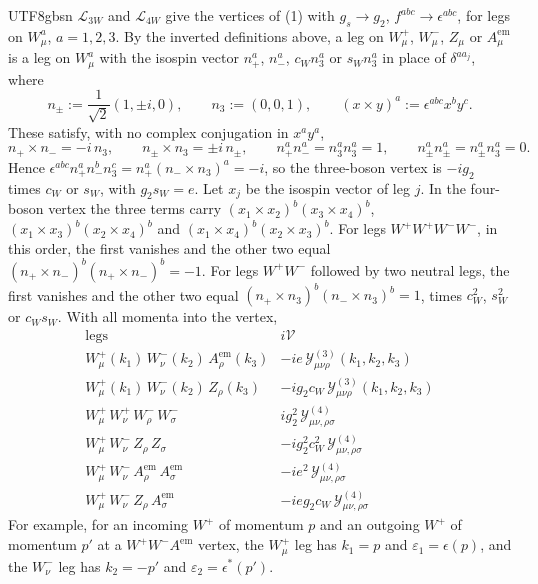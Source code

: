 \documentclass[11pt,a4paper,oneside]{report}
\begin{document}
\begin{CJK*}{UTF8}{gbsn}
$\mathcal L_{3W}$ and $\mathcal L_{4W}$ give the vertices of (1) with $g_s\to g_2$, $f^{abc}\to\epsilon^{abc}$, for legs on $W^a_\mu$, $a=1,2,3$. By the inverted definitions above, a leg on $W^+_\mu$, $W^-_\mu$, $Z_\mu$ or $A^{\mathrm{em}}_\mu$ is a leg on $W^a_\mu$ with the isospin vector $n_+^a$, $n_-^a$, $c_Wn_3^a$ or $s_Wn_3^a$ in place of $\delta^{aa_j}$, where
\begin{equation*}
n_\pm:=\frac1{\sqrt2}(1,\pm i,0),\qquad n_3:=(0,0,1),\qquad (x\times y)^a:=\epsilon^{abc}x^by^c .
\tag{A.19}\label{eq:A.19}
\end{equation*}
These satisfy, with no complex conjugation in $x^ay^a$,
\begin{equation*}
n_+\times n_-=-i\,n_3,\qquad n_\pm\times n_3=\pm i\,n_\pm,\qquad
n_+^an_-^a=n_3^an_3^a=1,\qquad n_\pm^an_\pm^a=n_\pm^an_3^a=0 .
\tag{A.20}\label{eq:A.20}
\end{equation*}
Hence $\epsilon^{abc}n_+^an_-^bn_3^c=n_+^a(n_-\times n_3)^a=-i$, so the three-boson vertex is $-ig_2$ times $c_W$ or $s_W$, with $g_2s_W=e$. Let $x_j$ be the isospin vector of leg $j$. In the four-boson vertex the three terms carry $(x_1\times x_2)^b(x_3\times x_4)^b$, $(x_1\times x_3)^b(x_2\times x_4)^b$ and $(x_1\times x_4)^b(x_2\times x_3)^b$. For legs $W^+W^+W^-W^-$, in this order, the first vanishes and the other two equal $(n_+\times n_-)^b(n_+\times n_-)^b=-1$. For legs $W^+W^-$ followed by two neutral legs, the first vanishes and the other two equal $(n_+\times n_3)^b(n_-\times n_3)^b=1$, times $c_W^2$, $s_W^2$ or $c_Ws_W$. With all momenta into the vertex,
\begin{equation*}
\begin{array}{l|l}
\text{legs}&i\mathcal V\\ \hline
W^+_\mu(k_1)\,W^-_\nu(k_2)\,A^{\mathrm{em}}_\rho(k_3)&-ie\,\mathcal Y^{(3)}_{\mu\nu\rho}(k_1,k_2,k_3)\\[4pt]
W^+_\mu(k_1)\,W^-_\nu(k_2)\,Z_\rho(k_3)&-ig_2c_W\,\mathcal Y^{(3)}_{\mu\nu\rho}(k_1,k_2,k_3)\\[4pt]
W^+_\mu\,W^+_\nu\,W^-_\rho\,W^-_\sigma&ig_2^2\,\mathcal Y^{(4)}_{\mu\nu,\rho\sigma}\\[4pt]
W^+_\mu\,W^-_\nu\,Z_\rho\,Z_\sigma&-ig_2^2c_W^2\,\mathcal Y^{(4)}_{\mu\nu,\rho\sigma}\\[4pt]
W^+_\mu\,W^-_\nu\,A^{\mathrm{em}}_\rho\,A^{\mathrm{em}}_\sigma&-ie^2\,\mathcal Y^{(4)}_{\mu\nu,\rho\sigma}\\[4pt]
W^+_\mu\,W^-_\nu\,Z_\rho\,A^{\mathrm{em}}_\sigma&-ieg_2c_W\,\mathcal Y^{(4)}_{\mu\nu,\rho\sigma}
\end{array}
\tag{A.21}\label{eq:A.21}
\end{equation*}
For example, for an incoming $W^+$ of momentum $p$ and an outgoing $W^+$ of momentum $p'$ at a $W^+W^-A^{\mathrm{em}}$ vertex, the $W^+_\mu$ leg has $k_1=p$ and $\varepsilon_1=\epsilon(p)$, and the $W^-_\nu$ leg has $k_2=-p'$ and $\varepsilon_2=\epsilon^*(p')$.


\end{CJK*}
\end{document}
